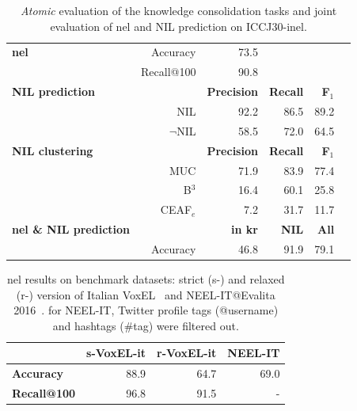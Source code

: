 \begin{table}[H]
    \centering
    \begin{tabular}{lr|rrrr}
        \toprule
        \textbf{\Acl{nel}} & Accuracy & 73.5 & & & \\
        & Recall@100 & 90.8 & & & \\
        \midrule
        \textbf{NIL prediction} & & \textbf{Precision} & \textbf{Recall} & \textbf{F$_1$} \\
        & NIL & 92.2 & 86.5 & 89.2 \\
        & $\neg$NIL & 58.5 & 72.0 & 64.5 \\
        \midrule
        \textbf{NIL clustering} & & \textbf{Precision} & \textbf{Recall} & \textbf{F$_1$} \\
        & MUC & 71.9 & 83.9 & 77.4 \\
        & B$^{3}$ & 16.4 & 60.1 & 25.8 \\
        & CEAF$_{e}$ & 7.2 & 31.7 & 11.7 \\
        \midrule
        \textbf{\Ac{nel} \& NIL prediction} & & \textbf{in \ac{kr}} & \textbf{NIL} & \textbf{All} \\
        & Accuracy & 46.8 & 91.9 & 79.1 \\
        \bottomrule
    \end{tabular}
    \caption{\textit{Atomic} evaluation of the knowledge consolidation tasks and joint evaluation of \ac{nel} and NIL prediction on ICCJ30-\acs{inel}.}
    \label{tab:nereval:atomic}
\end{table}

\begin{table}[h]
    \centering
    \begin{tabular}{l|rrr}
        \toprule
        & \textbf{s-VoxEL-it} & \textbf{r-VoxEL-it} & \textbf{NEEL-IT} \\
        \midrule
        \textbf{Accuracy}  & 88.9 & 64.7 & 69.0 \\
        \textbf{Recall@100} & 96.8 & 91.5 & - \\
        \bottomrule
    \end{tabular}
    \caption[\ac{nel} results on benchmark datasets.]{\ac{nel} results on benchmark datasets: strict (s-) and relaxed (r-) version of Italian VoxEL~\cite{rosales2018voxel} and NEEL-IT@Evalita 2016~\cite{basile2016neelit}. for NEEL-IT, Twitter profile tags (@username) and hashtags (\#tag) were filtered out.}
    \label{tab:nelsota}
\end{table}

